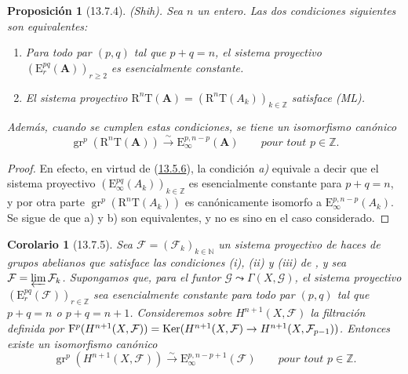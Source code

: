 \documentclass[10pt,oneside,openany]{book}
\theoremstyle{egaenv}\newtheorem*{env}{---}
\theoremstyle{egastatement}
\newtheorem*{proposition}{Proposición}
\newtheorem*{corollary}{Corolario}
\theoremstyle{egadescription}
\renewcommand{\geq}{\geqslant}
\renewcommand{\to}{\mathchoice{\longrightarrow}{\rightarrow}{\rightarrow}{\rightarrow}}
\begin{document}
\begin{proposition}[13.7.4]
\label{0.13.7.4}
\label{0.13.7.4-fr}
(Shih).
Sea $n$ un entero.
Las dos condiciones siguientes son equivalentes:
\begin{enumerate}
  \item[{\rm a)}] Para todo par $(p,q)$ tal que $p+q=n$, el
  sistema proyectivo
  $(\mathrm E_r^{pq}(\mathbf A))_{r\geq2}$ es esencialmente constante.
  \item[{\rm b)}] El sistema proyectivo
  $\mathrm R^n\mathrm T(\mathbf A)=
(\mathrm R^n\mathrm T(A_k))_{k\in\mathbb Z}$ satisface \textup{(ML)}.
\end{enumerate}
Además, cuando se cumplen estas condiciones, se tiene un isomorfismo canónico
\begin{equation}
\label{0.13.7.4.1-fr}
\tag{13.7.4.1}
\operatorname{gr}^p(\mathrm R^n\mathrm T(\mathbf A))
\xrightarrow{\sim}\mathrm E_\infty^{p,n-p}(\mathbf A)
\qquad\textit{pour tout $p\in\mathbb Z$.}
\end{equation}
\end{proposition}
\begin{proof}
En efecto, en virtud de (\hyperref[0.13.5.6-fr]{13.5.6}), la condición \emph{a)} equivale a decir que el sistema proyectivo $(\mathrm E_\infty^{pq}(A_k))_{k\in\mathbb Z}$ es esencialmente constante para $p+q=n$, y por otra parte
$\operatorname{gr}^p(\mathrm R^n\mathrm T(A_k))$ es canónicamente isomorfo a
$\mathrm E_\infty^{p,n-p}(A_k)$.
Se sigue de  que {\rm a)} y {\rm b)} son
equivalentes, y  no es sino
 en el caso considerado.
\end{proof}

\begin{corollary}[13.7.5]
\label{0.13.7.5}
\label{0.13.7.5-fr}
Sea $\boldsymbol{\mathcal F}=(\mathcal F_k)_{k\in\mathbb N}$ un sistema proyectivo de
haces de grupos abelianos que satisface las condiciones {\rm(i)}, {\rm(ii)}
y {\rm(iii)} de , y sea
$\mathcal F=\varprojlim\mathcal F_k$.
Supongamos que, para el funtor
$\mathcal G\leadsto\Gamma(X,\mathcal G)$, el sistema proyectivo $(\mathrm E_r^{pq}(\boldsymbol{\mathcal F}))_{r\in\mathbb Z}$ sea esencialmente constante para todo par $(p,q)$ tal que $p+q=n$ o $p+q=n+1$. Consideremos sobre $H^{n+1}(X,\mathcal F)$ la filtración definida por $\mathrm F^p(H^{n+1}(X,\mathcal F))=
\operatorname{Ker}(H^{n+1}(X,\mathcal F)\to
H^{n+1}(X,\mathcal F_{p-1}))$.
Entonces existe un isomorfismo canónico
\begin{equation}
\label{0.13.7.5.1-fr}
\tag{13.7.5.1}
\operatorname{gr}^p(H^{n+1}(X,\mathcal F))
\xrightarrow{\sim}\mathrm E_\infty^{p,n-p+1}(\boldsymbol{\mathcal F})
\qquad\textit{pour tout $p\in\mathbb Z$.}
\end{equation}
\end{corollary}
\end{document}
